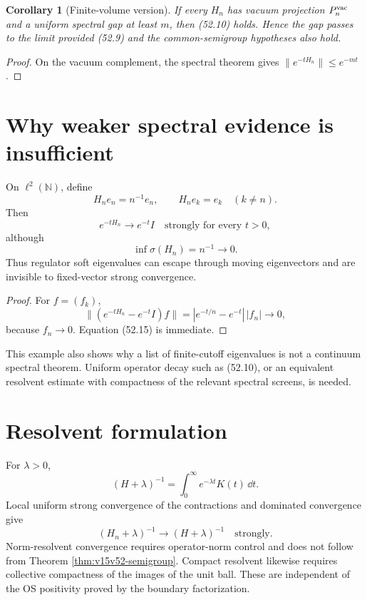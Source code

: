 \documentclass[11pt]{article}
\newtheorem{corollary}[theorem]{Corollary}
\theoremstyle{remark}
\begin{document}
\begin{corollary}[Finite-volume version]
\label{cor:v15v52-finite-gap}
If every \(H_n\) has vacuum projection \(P_n^{\rm vac}\) and a
uniform spectral gap at least \(m\), then (52.10) holds.  Hence the
gap passes to the limit provided (52.9) and the common-semigroup
hypotheses also hold.
\end{corollary}

\begin{proof}
On the vacuum complement, the spectral theorem gives
\(\|e^{-tH_n}\|\leq e^{-mt}\).
\end{proof}

\section{Why weaker spectral evidence is insufficient}

\begin{countertheorem}
\label{cth:v15v52-escape}
On \(\ell^2(\mathbb N)\), define
\[
 H_ne_n=n^{-1}e_n,\qquad H_ne_k=e_k\quad(k\neq n).       \tag{52.13}
\]
Then
\[
 e^{-tH_n}\longrightarrow e^{-t}I
 \quad\text{strongly for every \(t>0\)},                 \tag{52.14}
\]
although
\[
 \inf\sigma(H_n)=n^{-1}\longrightarrow0.                \tag{52.15}
\]
Thus regulator soft eigenvalues can escape through moving
eigenvectors and are invisible to fixed-vector strong convergence.
\end{countertheorem}

\begin{proof}
For \(f=(f_k)\),
\[
 \|(e^{-tH_n}-e^{-t}I)f\|
 =|e^{-t/n}-e^{-t}|\,|f_n|\longrightarrow0,
\]
because \(f_n\to0\).  Equation (52.15) is immediate.
\end{proof}

This example also shows why a list of finite-cutoff eigenvalues is
not a continuum spectral theorem.  Uniform operator decay such as
(52.10), or an equivalent resolvent estimate with compactness of the
relevant spectral screens, is needed.

\section{Resolvent formulation}

For \(\lambda>0\),
\[
 (H+\lambda)^{-1}
 =\int_0^\infty e^{-\lambda t}K(t)\,\dd t.              \tag{52.16}
\]
Local uniform strong convergence of the contractions and dominated
convergence give
\[
 (H_n+\lambda)^{-1}\longrightarrow(H+\lambda)^{-1}
 \quad\text{strongly}.                                  \tag{52.17}
\]
Norm-resolvent convergence requires operator-norm control and does
not follow from Theorem \ref{thm:v15v52-semigroup}.  Compact
resolvent likewise requires collective compactness of the images of
the unit ball.  These are independent of the OS positivity proved
by the boundary factorization.
\end{document}
